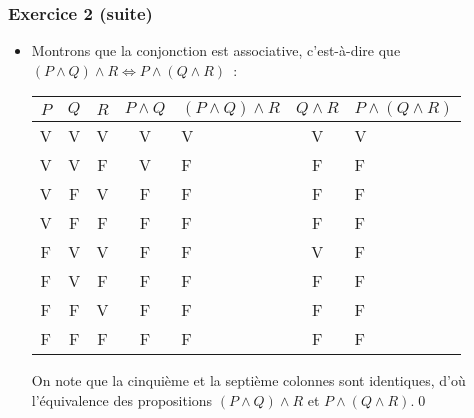 \documentclass[10pt,notheorems]{beamer}
\theoremstyle{plain}
\theoremstyle{definition} %
\begin{document}
\begin{frame}
  \frametitle{Exercice 2 (suite)}
  \fontsize{8}{10}\selectfont

  \begin{itemize}

  \item Montrons que la conjonction est associative, c'est-à-dire que $(P\land Q)\land R \Leftrightarrow P\land (Q\land R)$~:\newline
    \begin{table}[H]
      \centering
      \begin{tabular}[H]{|ccc|cgcg|}
        \hline
        $P$ & $Q$ & $R$ & $P\land Q$ & $(P\land Q)\land R$ & $Q\land R$ & $P \land (Q \land R)$ \\ \hline
        V & V & V & V & V & V & V\\
        V & V & F & V & F & F & F\\
        V & F & V & F & F & F & F\\
        V & F & F & F & F & F & F\\
        F & V & V & F & F & V & F\\
        F & V & F & F & F & F & F\\
        F & F & V & F & F & F & F\\
        F & F & F & F & F & F & F\\
        \hline\hline
      \end{tabular}
    \end{table}

    \bigskip

    On note que la cinquième et la septième colonnes sont identiques, d'où
    l'équivalence des propositions $(P\land Q)\land R$ et $P\land (Q\land R)$.\qed\newline

  \end{itemize}

\end{frame}
\end{document}
